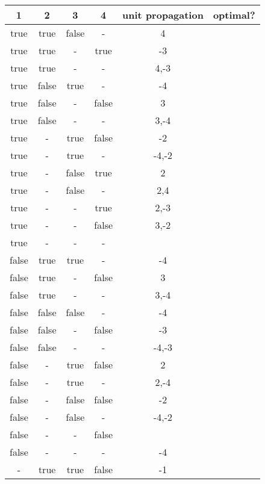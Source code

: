 \begin{longtable}{|c|c|c|c|c|c|}
\hline 1 & 2 & 3 & 4 & unit propagation & optimal? \\ \hline 
true & true & false & - & 4               &    \\ \hline 
true & true & - & true & -3              &    \\ \hline 
true & true & - & - & 4,-3            &    \\ \hline 
true & false & true & - & -4              &    \\ \hline 
true & false & - & false & 3               &    \\ \hline 
true & false & - & - & 3,-4            &    \\ \hline 
true & - & true & false & -2              &    \\ \hline 
true & - & true & - & -4,-2           &    \\ \hline 
true & - & false & true & 2               &    \\ \hline 
true & - & false & - & 2,4             &    \\ \hline 
true & - & - & true & 2,-3            &    \\ \hline 
true & - & - & false & 3,-2            &    \\ \hline 
true & - & - & - &                 &    \\ \hline 
false & true & true & - & -4              &    \\ \hline 
false & true & - & false & 3               &    \\ \hline 
false & true & - & - & 3,-4            &    \\ \hline 
false & false & false & - & -4              &    \\ \hline 
false & false & - & false & -3              &    \\ \hline 
false & false & - & - & -4,-3           &    \\ \hline 
false & - & true & false & 2               &    \\ \hline 
false & - & true & - & 2,-4            &    \\ \hline 
false & - & false & false & -2              &    \\ \hline 
false & - & false & - & -4,-2           &    \\ \hline 
false & - & - & false &                 &    \\ \hline 
false & - & - & - & -4              &    \\ \hline 
- & true & true & false & -1              &    \\ \hline 

\end{longtable}
